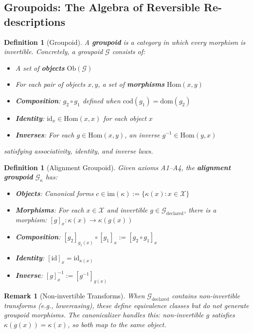 \documentclass[12pt]{article}
\newtheorem{definition}[theorem]{Definition}
\newtheorem{remark}[theorem]{Remark}
\begin{document}
\subsection{Groupoids: The Algebra of Reversible Re-descriptions}

\begin{definition}[Groupoid]
\emph{A \textbf{groupoid} is a category in which every morphism is invertible. Concretely, a groupoid $\mathcal{G}$ consists of:}
\begin{itemize}
    \item \emph{A set of \textbf{objects}} $\mathrm{Ob}(\mathcal{G})$
    \item \emph{For each pair of objects $x, y$, a set of \textbf{morphisms}} $\mathrm{Hom}(x, y)$
    \item \textbf{\emph{Composition}}: $g_2 \circ g_1$ \emph{defined when} $\mathrm{cod}(g_1) = \mathrm{dom}(g_2)$
    \item \textbf{\emph{Identity}}: $\mathrm{id}_x \in \mathrm{Hom}(x, x)$ \emph{for each object $x$}
    \item \textbf{\emph{Inverses}}: \emph{For each $g \in \mathrm{Hom}(x, y)$, an inverse $g^{-1} \in \mathrm{Hom}(y, x)$}
\end{itemize}
\emph{satisfying associativity, identity, and inverse laws.}
\end{definition}

\begin{definition}[Alignment Groupoid]
\emph{Given axioms A1--A4, the \textbf{alignment groupoid} $\mathcal{G}_\kappa$ has:}
\begin{itemize}
    \item \textbf{\emph{Objects}}: \emph{Canonical forms $c \in \mathrm{im}(\kappa) := \{\kappa(x)\colon x \in \mathcal{X}\}$}
    \item \textbf{\emph{Morphisms}}: \emph{For each $x \in \mathcal{X}$ and invertible $g \in \mathcal{G}_{\mathrm{declared}}$, there is a morphism}: $[g]_x\colon \kappa(x) \to \kappa(g(x))$
    \item \textbf{\emph{Composition}}: $[g_2]_{g_1(x)} \circ [g_1]_x := [g_2 \circ g_1]_x$
    \item \textbf{\emph{Identity}}: $[\mathrm{id}]_x = \mathrm{id}_{\kappa(x)}$
    \item \textbf{\emph{Inverse}}: $[g]_x^{-1} := [g^{-1}]_{g(x)}$
\end{itemize}
\end{definition}

\begin{remark}[Non-invertible Transforms]
\emph{When $\mathcal{G}_{\mathrm{declared}}$ contains non-invertible transforms (e.g., lowercasing), these define equivalence classes but do not generate groupoid morphisms. The canonicalizer handles this: non-invertible $g$ satisfies $\kappa(g(x)) = \kappa(x)$, so both map to the same object.}
\end{remark}
\end{document}
